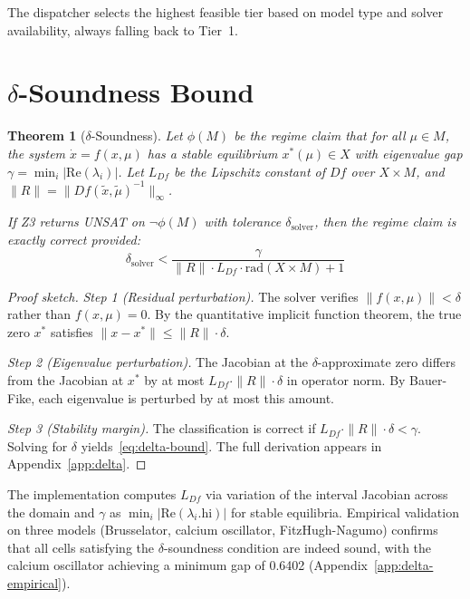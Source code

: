 \documentclass[11pt]{article}
\newtheorem{theorem}{Theorem}
\newcommand{\norm}[1]{\|#1\|}
\begin{document}
The dispatcher selects the highest feasible tier based on model type and solver availability, always falling back to Tier~1.

\section{$\delta$-Soundness Bound}
\label{sec:delta}

\begin{theorem}[$\delta$-Soundness]
\label{thm:delta}
Let $\phi(M)$ be the regime claim that for all $\mu \in M$, the system $\dot{x} = f(x,\mu)$ has a stable equilibrium $x^*(\mu) \in X$ with eigenvalue gap $\gamma = \min_i |\mathrm{Re}(\lambda_i)|$.
Let $L_{Df}$ be the Lipschitz constant of $Df$ over $X \times M$, and $\norm{R} = \norm{Df(\tilde{x}, \tilde{\mu})^{-1}}_\infty$.

If Z3 returns UNSAT on $\neg\phi(M)$ with tolerance $\delta_{\mathrm{solver}}$, then the regime claim is exactly correct provided:
\begin{equation}
\label{eq:delta-bound}
\delta_{\mathrm{solver}} < \frac{\gamma}{\norm{R} \cdot L_{Df} \cdot \mathrm{rad}(X \times M) + 1}
\end{equation}
\end{theorem}

\begin{proof}[Proof sketch]
\emph{Step 1 (Residual perturbation).}
The solver verifies $\norm{f(x, \mu)} < \delta$ rather than $f(x,\mu) = 0$.
By the quantitative implicit function theorem, the true zero $x^*$ satisfies $\norm{x - x^*} \leq \norm{R} \cdot \delta$.

\emph{Step 2 (Eigenvalue perturbation).}
The Jacobian at the $\delta$-approximate zero differs from the Jacobian at $x^*$ by at most $L_{Df} \cdot \norm{R} \cdot \delta$ in operator norm.
By Bauer-Fike, each eigenvalue is perturbed by at most this amount.

\emph{Step 3 (Stability margin).}
The classification is correct if $L_{Df} \cdot \norm{R} \cdot \delta < \gamma$.
Solving for $\delta$ yields~\eqref{eq:delta-bound}.
The full derivation appears in Appendix~\ref{app:delta}.
\end{proof}

The implementation computes $L_{Df}$ via variation of the interval Jacobian across the domain and $\gamma$ as $\min_i |\mathrm{Re}(\lambda_i.\mathrm{hi})|$ for stable equilibria.
Empirical validation on three models (Brusselator, calcium oscillator, FitzHugh-Nagumo) confirms that all cells satisfying the $\delta$-soundness condition are indeed sound, with the calcium oscillator achieving a minimum gap of 0.6402 (Appendix~\ref{app:delta-empirical}).
\end{document}
